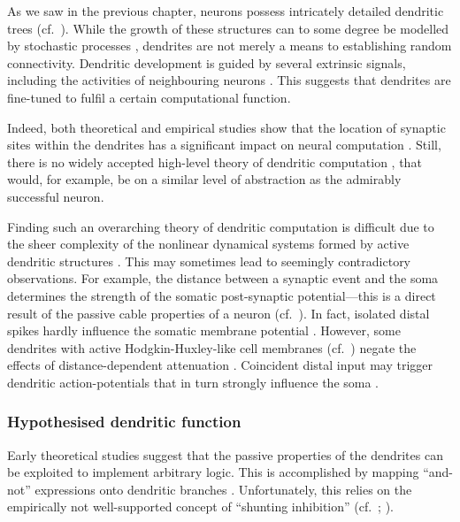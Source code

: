 

As we saw in the previous chapter, neurons possess intricately detailed dendritic trees (cf.~).
While the growth of these structures can to some degree be modelled by stochastic processes \citep[e.g.,][]{nowakowski1992competitive}, dendrites are not merely a means to establishing random connectivity.
Dendritic development is guided by several extrinsic signals, including the activities of neighbouring neurons \citep{mcallister2000cellular}.
This suggests that dendrites are fine-tuned to fulfil a certain computational function.

Indeed, both theoretical and empirical studies show that the location of synaptic sites within the dendrites has a significant impact on neural computation \citep{mel1994information,koch2002singlecell,polsky2004computational}.
Still, there is no widely accepted high-level theory of dendritic computation \citep{london2005dendritic}, that would, for example, be on a similar level of abstraction as the admirably successful \LIF neuron.

Finding such an overarching theory of dendritic computation is difficult due to the sheer complexity of the nonlinear dynamical systems formed by active dendritic structures \citep{beniaguev2021single}.
This may sometimes lead to seemingly contradictory observations.
For example, the distance between a synaptic event and the soma determines the strength of the somatic post-synaptic potential---this is a direct result of the passive cable properties of a neuron (cf.~).
In fact, isolated distal spikes hardly influence the somatic membrane potential \citep{stuart1998determinants}.
However, some dendrites with active Hodgkin-Huxley-like cell membranes (cf.~) negate the effects of distance-dependent attenuation \citep{koch2002singlecell}.
Coincident distal input may trigger dendritic action-potentials that in turn strongly influence the soma \citep{williams2002dependence}.

\subsubsection{Hypothesised dendritic function}
Early theoretical studies suggest that the passive properties of the dendrites can be exploited to implement arbitrary logic.
This is accomplished by mapping \enquote{and-not} expressions onto dendritic branches \citep{koch1983nonlinear,mel1994information,london2005dendritic}.
Unfortunately, this relies on the empirically not well-supported concept of \enquote{shunting inhibition} (cf.~; \cite{holt1997shunting,abbott2005drivers}).

